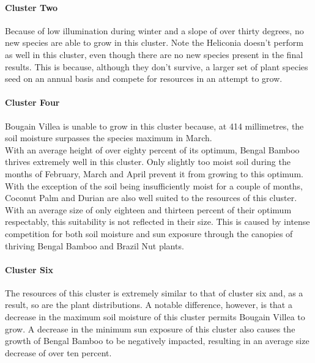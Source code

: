 \paragraph{Cluster Two}

Because of low illumination during winter and a slope of over thirty degrees, no new species are able to grow in this cluster. Note the Heliconia doesn't perform as well in this cluster, even though there are no new species present in the final results. This is because, although they don't survive, a larger set of plant species seed on an annual basis and compete for resources in an attempt to grow. 

\paragraph{Cluster Four}

Bougain Villea is unable to grow in this cluster because, at 414 millimetres, the soil moisture surpasses the species maximum in March.\\
With an average height of over eighty percent of its optimum, Bengal Bamboo thrives extremely well in this cluster. Only slightly too moist soil during the months of February, March and April prevent it from growing to this optimum.\\
With the exception of the soil being insufficiently moist for a couple of months, Coconut Palm and Durian are also well suited to the resources of this cluster. With an average size of only eighteen and thirteen percent of their optimum respectably, this suitability is not reflected in their size. This is caused by intense competition for both soil moisture and sun exposure through the canopies of thriving Bengal Bamboo and Brazil Nut plants.

\paragraph{Cluster Six}

The resources of this cluster is extremely similar to that of cluster six and, as a result, so are the plant distributions. A notable difference, however, is that a decrease in the maximum soil moisture of this cluster permits Bougain Villea to grow. A decrease in the minimum sun exposure of this cluster also causes the growth of Bengal Bamboo to be negatively impacted, resulting in an average size decrease of over ten percent.


